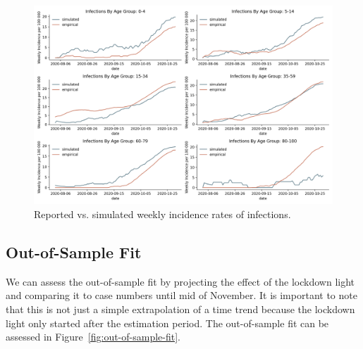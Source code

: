 \begin{figure}[ht]
    \centering
    \includegraphics[width=1.1\textwidth]{../figures/goodness_of_fit_by_age_group}
    \caption{Reported vs. simulated weekly incidence rates of infections.}
    \label{fig:goodness_of_fit}
\end{figure}

\FloatBarrier

\subsection{Out-of-Sample Fit}
\label{sub:out_of_sample_fit}

We can assess the out-of-sample fit by projecting the effect of the lockdown light and
comparing it to case numbers until mid of November. It is important to note that this
is not just a simple extrapolation of a time trend because the lockdown light only started
after the estimation period. The out-of-sample fit can be assessed in
Figure~\ref{fig:out-of-sample-fit}.

